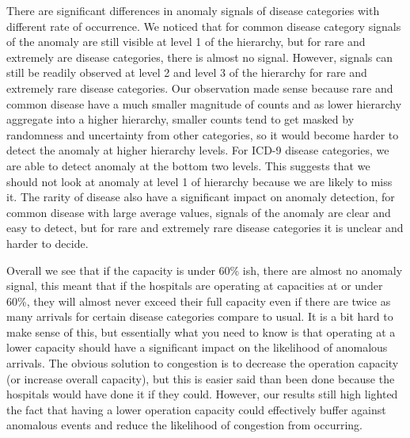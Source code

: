 \newpara

There are significant differences in anomaly signals of disease categories with different rate of occurrence. We noticed that for common disease category signals of the anomaly are still visible at level 1 of the hierarchy, but for rare and extremely are disease categories, there is almost no signal. However, signals can still be readily observed at level 2 and level 3 of the hierarchy for rare and extremely rare disease categories. Our observation made sense because rare and common disease have a much smaller magnitude of counts and as lower hierarchy aggregate into a higher hierarchy, smaller counts tend to get masked by randomness and uncertainty from other categories, so it would become harder to detect the anomaly at higher hierarchy levels. For ICD-9 disease categories, we are able to detect anomaly at the bottom two levels. This suggests that we should not look at anomaly at level 1 of hierarchy because we are likely to miss it. The rarity of disease also have a significant impact on anomaly detection, for common disease with large average values, signals of the anomaly are clear and easy to detect, but for rare and extremely rare disease categories it is unclear and harder to decide.

\newpara

Overall we see that if the capacity is under 60\% ish, there are almost no anomaly signal, this meant that if the hospitals are operating at capacities at or under 60\%, they will almost never exceed their full capacity even if there are twice as many arrivals for certain disease categories compare to usual. It is a bit hard to make sense of this, but essentially what you need to know is that operating at a lower capacity should have a significant impact on the likelihood of anomalous arrivals. The obvious solution to congestion is to decrease the operation capacity (or increase overall capacity), but this is easier said than been done because the hospitals would have done it if they could. However, our results still high lighted the fact that having a lower operation capacity could effectively buffer against anomalous events and reduce the likelihood of congestion from occurring. 
	
	
